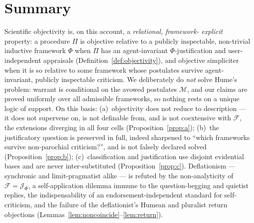 \documentclass{amsart}
\theoremstyle{definition}
\theoremstyle{plain}
\theoremstyle{remark}
\begin{document}
\section{Summary}

Scientific objectivity is, on this account, a \emph{relational, framework-
explicit} property: a procedure $\Pi$ is objective relative to a publicly
inspectable, non-trivial inductive framework $\Phi$ when $\Pi$ has an
agent-invariant $\Phi$-justification and user-independent appraisals
(Definition~\ref{def:objectivity}), and objective simpliciter when it is so
relative to some framework whose postulates survive agent-invariant, publicly
inspectable criticism. We deliberately do \emph{not} solve Hume's problem:
warrant is conditional on the avowed postulates $\mathcal{M}$, and our claims
are proved uniformly over all admissible frameworks, so nothing rests on a
unique logic of support. On this basis: (a)~objectivity does not reduce to description --- it does not supervene on,
is not definable from, and is not coextensive with $\mathcal{F}$, the
extensions diverging in all four cells (Proposition~\ref{prop:a}); (b)~the justificatory question is preserved in full,
indeed sharpened to ``which frameworks survive non-parochial criticism?'', and
is not falsely declared solved (Proposition~\ref{prop:b}); (c)~classification
and justification use disjoint evidential bases and are never inter-substituted
(Proposition~\ref{prop:c}). Deflationism --- synchronic and limit-pragmatist
alike --- is refuted by the non-analyticity of $\mathcal{F}=\mathcal{J}_\Phi$, a
self-application dilemma immune to the question-begging and quietist replies,
the indispensability of an endorsement-independent standard for self-criticism,
and the failure of the deflationist's Humean and pluralist return objections
(Lemmas~\ref{lem:noncoincide}--\ref{lem:return}).
\end{document}

